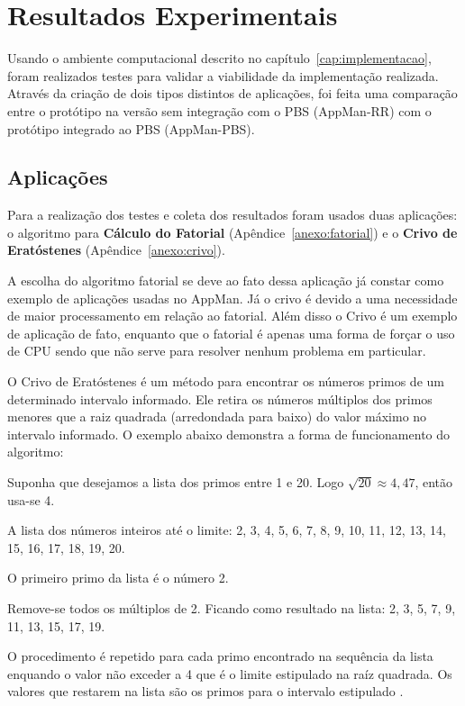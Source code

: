 \chapter{Resultados Experimentais}
\label{cap:resultados}

Usando o ambiente computacional descrito no capítulo~\ref{cap:implementacao}, foram realizados testes para validar a viabilidade da implementação realizada. Através da criação de dois tipos distintos de aplicações, foi feita uma comparação entre o protótipo na versão sem integração com o PBS (AppMan-RR) com o protótipo integrado ao PBS (AppMan-PBS). 

\section{Aplicações}

Para a realização dos testes e coleta dos resultados foram usados duas aplicações: o algoritmo para \textbf{Cálculo do Fatorial} (Apêndice~\ref{anexo:fatorial}) e o \textbf{Crivo de Eratóstenes} (Apêndice~\ref{anexo:crivo}).

A escolha do algoritmo fatorial se deve ao fato dessa aplicação já constar como exemplo de aplicações usadas no AppMan. Já o crivo é devido a uma necessidade de maior processamento em relação ao fatorial. Além disso o Crivo é um exemplo de aplicação de fato, enquanto que o fatorial é apenas uma forma de forçar o uso de CPU sendo que não serve para resolver nenhum problema em particular.

O Crivo de Eratóstenes é um método para encontrar os números primos de um determinado intervalo informado. Ele retira os números múltiplos dos primos menores que a raiz quadrada (arredondada para baixo) do valor máximo no intervalo informado. O exemplo abaixo demonstra a forma de funcionamento do algoritmo:

Suponha que desejamos a lista dos primos entre 1 e 20. Logo $\sqrt{20} \approx 4,47$, então usa-se 4. 

A lista dos números inteiros até o limite: 2, 3, 4, 5, 6, 7, 8, 9, 10, 11, 12, 13, 14, 15, 16, 17, 18, 19, 20. 

O primeiro primo da lista é o número 2. 

Remove-se todos os múltiplos de 2. Ficando como resultado na lista: 2, 3, 5, 7, 9, 11, 13, 15, 17, 19.

O procedimento é repetido para cada primo encontrado na sequência da lista enquando o valor não exceder a 4 que é o limite estipulado na raíz quadrada. Os valores que restarem na lista são os primos para o intervalo estipulado \cite{Ewerton2008}.

